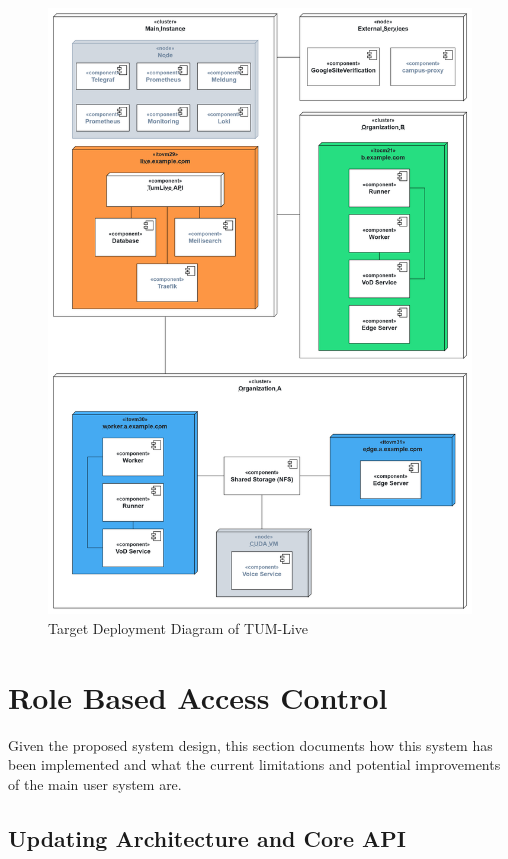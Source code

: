 \begin{figure}[htpb]
    \centering
    \includegraphics[width=390pt]{images/NewDeploymentDiagram.png}
    \caption[Target System Architecture]{Target Deployment Diagram of TUM-Live}\label{fig:system-architecture}
\end{figure}

\newpage


\section{Role Based Access Control}\label{section:rbac}

Given the proposed system design, this section documents how this system has been implemented and what the current limitations and potential improvements of the main user system are. 

\subsection{Updating Architecture and Core API}

